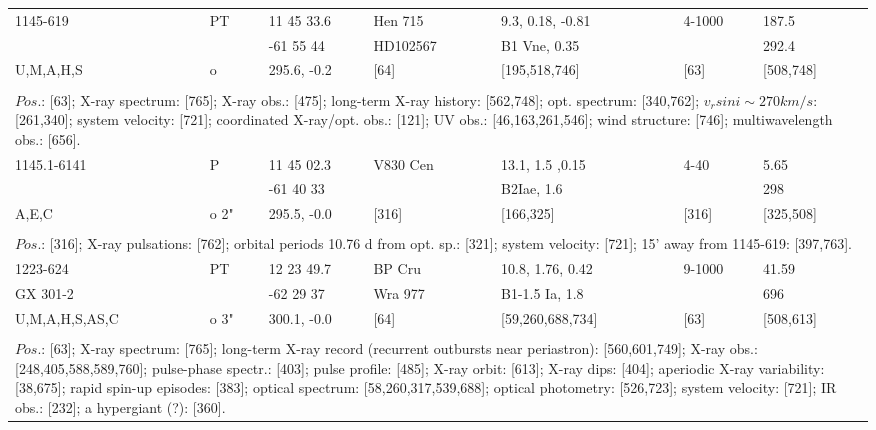 \documentclass{aa}
\begin{document}
\begin{table*}[h]
\begin{tabular}{p{2.5cm}p{1cm}p{1.8cm}p{2.3cm}p{3.3cm}p{2.0cm}p{2.2cm}}
\noalign{\smallskip}
\hline
\noalign{\smallskip}
 1145-619      &   PT      & 11 45 33.6       & Hen 715            & 9.3, 0.18, -0.81       & 4-1000              &  187.5                 \\
                        &              & -61 55 44         &  HD102567        & B1 Vne, 0.35         &                           &  292.4       \\
U,M,A,H,S     &  o         & 295.6, -0.2       &     [64]                  & [195,518,746]      &        [63]            &  [508,748]    \\
\\
\multicolumn{7}{p{17.5cm}}{
$Pos$.: [63]; X-ray spectrum: [765]; X-ray obs.: [475]; long-term X-ray history: [562,748]; opt. spectrum: [340,762];
$v_rsin i \sim 270 km/s$: [261,340]; system velocity: [721]; coordinated X-ray/opt. obs.: [121]; UV obs.: [46,163,261,546];
wind structure: [746]; multiwavelength obs.: [656].}\\

\noalign{\smallskip}
\hline
\noalign{\smallskip}
 1145.1-6141  &   P       & 11 45 02.3       & V830 Cen           & 13.1, 1.5 ,0.15    & 4-40          & 5.65      \\
                          &            & -61 40 33         &                               & B2Iae, 1.6          &                   &  298        \\
    A,E,C           &  o 2"   & 295.5, -0.0       &     [316]                 & [166,325]            &  [316]       &  [325,508]    \\
\\
\multicolumn{7}{p{17.5cm}}{
$Pos$.: [316]; X-ray pulsations: [762]; orbital periods 10.76 d from opt. sp.: [321];
system velocity: [721]; 15' away from 1145-619: [397,763].}\\

\noalign{\smallskip}
\hline
\noalign{\smallskip}
 1223-624     &   PT     & 12 23 49.7       & BP Cru       & 10.8, 1.76, 0.42           & 9-1000              & 41.59                  \\
GX 301-2      &             & -62 29 37         &  Wra 977    & B1-1.5 Ia, 1.8             &                           &  696        \\
U,M,A,H,S,AS,C &  o 3"   & 300.1, -0.0       &     [64]           & [59,260,688,734]   &     [63]               &  [508,613]   \\
\\
\multicolumn{7}{p{17.5cm}}{
$Pos$.: [63]; X-ray spectrum: [765]; long-term X-ray record (recurrent outbursts near periastron): [560,601,749];
X-ray obs.: [248,405,588,589,760]; pulse-phase spectr.: [403]; pulse profile: [485]; X-ray orbit: [613]; X-ray dips: [404]; 
aperiodic X-ray variability: [38,675]; rapid spin-up episodes: [383]; optical spectrum: [58,260,317,539,688]; 
optical photometry: [526,723]; system velocity: [721]; IR obs.: [232]; a hypergiant (?): [360].}\\


\end{tabular}
\end{table*}
\end{document}
